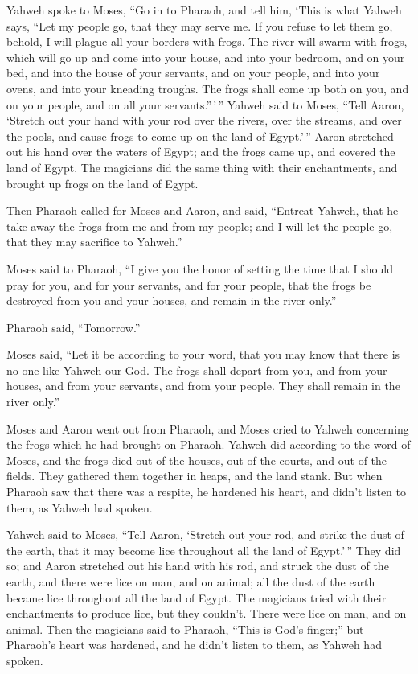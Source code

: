 Yahweh spoke to Moses, ``Go in to Pharaoh, and tell him,
`This is what Yahweh says, ``Let my people go, that they may serve me.
 If you refuse to let them go, behold, I will plague all
your borders with frogs.  The river will swarm with frogs,
which will go up and come into your house, and into your bedroom, and on
your bed, and into the house of your servants, and on your people, and
into your ovens, and into your kneading troughs.  The frogs
shall come up both on you, and on your people, and on all your
servants.''\,'\,''  Yahweh said to Moses, ``Tell Aaron,
`Stretch out your hand with your rod over the rivers, over the streams,
and over the pools, and cause frogs to come up on the land of
Egypt.'\,''  Aaron stretched out his hand over the waters of
Egypt; and the frogs came up, and covered the land of Egypt.
 The magicians did the same thing with their enchantments,
and brought up frogs on the land of Egypt.

 Then Pharaoh called for Moses and Aaron, and said,
``Entreat Yahweh, that he take away the frogs from me and from my
people; and I will let the people go, that they may sacrifice to
Yahweh.''

 Moses said to Pharaoh, ``I give you the honor of setting
the time that I should pray for you, and for your servants, and for your
people, that the frogs be destroyed from you and your houses, and remain
in the river only.''

 Pharaoh said, ``Tomorrow.''

Moses said, ``Let it be according to your word, that you may know that
there is no one like Yahweh our God.  The frogs shall
depart from you, and from your houses, and from your servants, and from
your people. They shall remain in the river only.''

 Moses and Aaron went out from Pharaoh, and Moses cried to
Yahweh concerning the frogs which he had brought on Pharaoh.
 Yahweh did according to the word of Moses, and the frogs
died out of the houses, out of the courts, and out of the fields.
 They gathered them together in heaps, and the land stank.
 But when Pharaoh saw that there was a respite, he hardened
his heart, and didn't listen to them, as Yahweh had spoken.

 Yahweh said to Moses, ``Tell Aaron, `Stretch out your rod,
and strike the dust of the earth, that it may become lice throughout all
the land of Egypt.'\,''  They did so; and Aaron stretched
out his hand with his rod, and struck the dust of the earth, and there
were lice on man, and on animal; all the dust of the earth became lice
throughout all the land of Egypt.  The magicians tried with
their enchantments to produce lice, but they couldn't. There were lice
on man, and on animal.  Then the magicians said to Pharaoh,
``This is God's finger;'' but Pharaoh's heart was hardened, and he
didn't listen to them, as Yahweh had spoken.

